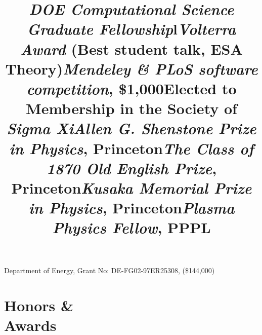 \documentclass[margin]{res}
\begin{document}
\begin{resume}
\title{\emph{\textbf{DOE} Computational Science Graduate Fellowship}}
\begin{position} 
  Department of Energy, Grant No: DE-FG02-97ER25308, (\$144,000)
  \vspace{-.25cm}
\end{position}


\section{Honors \& \\ Awards}
\begin{format}
\title{l}\\
\body
\end{format}



\title{\emph{Volterra Award} (Best student talk, ESA Theory)}
\begin{position} \vspace{-.7cm} \end{position}

\title{\emph{Mendeley \& PLoS software competition}, \$1,000}
\begin{position} \vspace{-.7cm} \end{position}

\title{Elected to Membership in the Society of \emph{Sigma Xi}}
\begin{position}   \vspace{-.7cm} \end{position}

\title{\emph{Allen G. Shenstone Prize in Physics}, Princeton}
\begin{position}   \vspace{-.7cm} \end{position}

\title{\emph{The Class of 1870 Old English Prize},  Princeton}
\begin{position}   \vspace{-.7cm} \end{position}

\title{\emph{Kusaka Memorial Prize in Physics}, Princeton}
\begin{position}   \vspace{-.7cm} \end{position}

\title{\emph{Plasma Physics Fellow},  PPPL }
\begin{position}   \vspace{-.7cm} \end{position}




\end{resume}
\end{document}

